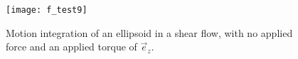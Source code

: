 \documentclass{article}
\newcommand{\vect}[1]{\boldsymbol{\mathbf{#1}}}
\begin{document}
\begin{figure}
  \centering
  \texttt{[image: f\_test9]}
  \caption{Motion integration of an ellipsoid in a shear flow, with no
    applied force and an applied torque of $\vec{e}_z$.}
  \label{fig:f9_plot}
\end{figure}




\end{document}
